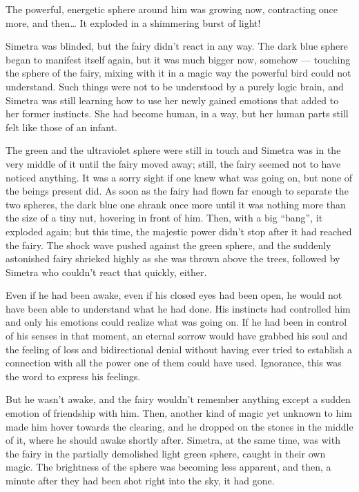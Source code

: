 The powerful, energetic sphere around him was growing now, contracting once more, and then\dots
It exploded in a shimmering burst of light!

Simetra was blinded, but the fairy didn't react in any way. The dark blue sphere began to manifest itself again, but it was much bigger now, somehow --- touching the sphere of the fairy, mixing with it in a magic way the powerful bird could not understand. Such things were not to be understood by a purely logic brain, and Simetra was still learning how to use her newly gained emotions that added to her former instincts. She had become human, in a way, but her human parts still felt like those of an infant.

The green and the ultraviolet sphere were still in touch and Simetra was in the very middle of it until the fairy moved away; still, the fairy seemed not to have noticed anything. It was a sorry sight if one knew what was going on, but none of the beings present did. 
As soon as the fairy had flown far enough to separate the two spheres, the dark blue one shrank once more until it was nothing more than the size of a tiny nut, hovering in front of him. 
Then, with a big \enquote{bang}, it exploded again; but this time, the majestic power didn't stop after it had reached the fairy. The shock wave pushed against the green sphere, and the suddenly astonished fairy shrieked highly as she was thrown above the trees, followed by Simetra who couldn't react that quickly, either.

Even if he had been awake, even if his closed eyes had been open, he would not have been able to understand what he had done. His instincts had controlled him and only his emotions could realize what was going on. If he had been in control of his senses in that moment, an eternal sorrow would have grabbed his soul and the feeling of loss and bidirectional denial without having ever tried to establish a connection with all the power one of them could have used. Ignorance, this was the word to express his feelings.

But he wasn't awake, and the fairy wouldn't remember anything except a sudden emotion of friendship with him. 
Then, another kind of magic yet unknown to him made him hover towards the clearing, and he dropped on the stones in the middle of it, where he should awake shortly after. 
Simetra, at the same time, was with the fairy in the partially demolished light green sphere, caught in their own magic. The brightness of the sphere was becoming less apparent, and then, a minute after they had been shot right into the sky, it had gone.

